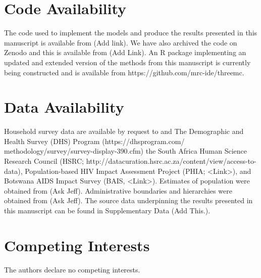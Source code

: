 \documentclass{article}
\begin{document}

\section*{Code Availability}


The code used to implement the models and produce the results presented in this manuscript is available from {\color{red}(Add link)}. We have also archived the code on Zenodo and this is available from {\color{red}(Add Link)}. An R package implementing an updated and extended version of the methods from this manuscript is currently being constructed and is available from https://github.com/mrc-ide/threemc.


\section*{Data Availability}


Household survey data are available by request to and The Demographic and Health Survey (DHS) Program (https://dhsprogram.com/ methodology/survey/survey-display-390.cfm) the South Africa Human Science Research Council (HSRC; http://datacuration.hsrc.ac.za/content/view/access-to-data), Population-based HIV Impact Assessment Project (PHIA; <Link>), and Botswana AIDS Impact Survey (BAIS, <Link>). Estimates of population were obtained from {\color{red}(Ask Jeff)}. Administrative boundaries and hierarchies were obtained from {\color{red}(Ask Jeff)}. The source data underpinning the results presented in this manuscript can be found in Supplementary Data {\color{red}(Add This.)}.


\section*{Competing Interests}


The authors declare no competing interests.
\end{document}
